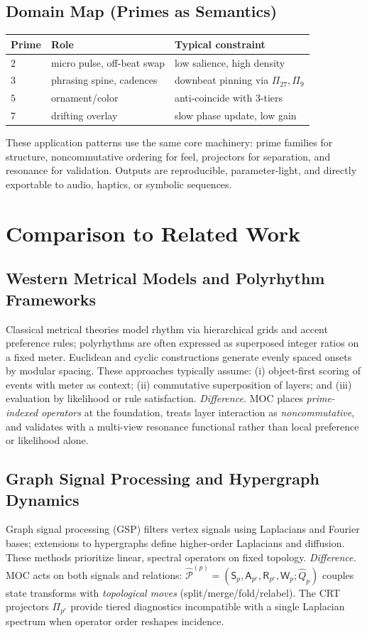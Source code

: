 \documentclass[12pt]{article}
\numberwithin{equation}{section}
\theoremstyle{plain}
\theoremstyle{definition}
\theoremstyle{remark}
\begin{document}
\subsection*{Domain Map (Primes as Semantics)}
\begin{center}
\begin{tabular}{lll}
\hline
Prime & Role & Typical constraint \\
\hline
$2$ & micro pulse, off-beat swap & low salience, high density \\
$3$ & phrasing spine, cadences & downbeat pinning via $\Pi_{27},\Pi_{9}$ \\
$5$ & ornament/color & anti-coincide with $3$-tiers \\
$7$ & drifting overlay & slow phase update, low gain \\
\hline
\end{tabular}
\end{center}

\noindent These application patterns use the same core machinery: prime families for structure, noncommutative ordering for feel, projectors for separation, and resonance for validation. Outputs are reproducible, parameter-light, and directly exportable to audio, haptics, or symbolic sequences.

\section*{Comparison to Related Work}

\subsection*{Western Metrical Models and Polyrhythm Frameworks}
Classical metrical theories model rhythm via hierarchical grids and accent preference rules; polyrhythms are often expressed as superposed integer ratios on a fixed meter. Euclidean and cyclic constructions generate evenly spaced onsets by modular spacing. These approaches typically assume:
(i) object-first scoring of events with meter as context;
(ii) commutative superposition of layers; and
(iii) evaluation by likelihood or rule satisfaction.
\emph{Difference.} MOC places \emph{prime-indexed operators} at the foundation, treats layer interaction as \emph{noncommutative}, and validates with a multi-view resonance functional rather than local preference or likelihood alone.

\subsection*{Graph Signal Processing and Hypergraph Dynamics}
Graph signal processing (GSP) filters vertex signals using Laplacians and Fourier bases; extensions to hypergraphs define higher-order Laplacians and diffusion. These methods prioritize linear, spectral operators on fixed topology. 
\emph{Difference.} MOC acts on both signals and relations: $\widehat{\mathcal{P}}^{(p)}=(\mathsf{S}_p,\mathsf{A}_{p^r},\mathsf{R}_{p^r},\mathsf{W}_p;\hat{Q}_p)$ couples state transforms with \emph{topological moves} (split/merge/fold/relabel). The CRT projectors $\Pi_{p^r}$ provide tiered diagnostics incompatible with a single Laplacian spectrum when operator order reshapes incidence.
\end{document}
